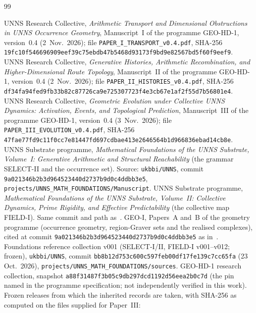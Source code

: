 \clearpage
{}
\begin{thebibliography}{99}\small\raggedright
{} UNNS Research Collective, \emph{Arithmetic Transport and Dimensional Obstructions in UNNS Occurrence Geometry}, Manuscript~I of the programme GEO-HD-1, version~0.4 (2~Nov.\ 2026); file \texttt{PAPER\_I\_TRANSPORT\_v0.4.pdf}, SHA-256 \texttt{19fc10f546696909eef39c75ebdb47b5468d93173f9bd9e82567bd5f60f9eef9}.
 UNNS Research Collective, \emph{Generative Histories, Arithmetic Recombination, and Higher-Dimensional Route Topology}, Manuscript~II of the programme GEO-HD-1, version~0.4 (2~Nov.\ 2026); file \texttt{PAPER\_II\_HISTORIES\_v0.4.pdf}, SHA-256 \texttt{df34fa94fed9fb33b82c87726ca9e725307723f4e3cb67e1af2f55d7b56801e4}.
 UNNS Research Collective, \emph{Geometric Evolution under Collective UNNS Dynamics: Activation, Events, and Topological Prediction}, Manuscript~III of the programme GEO-HD-1, version~0.4 (3~Nov.\ 2026); file \texttt{PAPER\_III\_EVOLUTION\_v0.4.pdf}, SHA-256 \texttt{47fae77fd9c11f0cc7e81447fd697cdbae413e2646564b1d966836ebad14cb8e}.
 UNNS Substrate programme, \emph{Mathematical Foundations of the UNNS Substrate, Volume~I: Generative Arithmetic and Structural Reachability} (the grammar SELECT-II and the occurrence set). Source: \texttt{ukbbi/UNNS}, commit \texttt{9a021346b2b3d964523440d2737b9d0c4ddbb3e5}, \texttt{projects/UNNS\_MATH\_FOUNDATIONS/Manuscript}.
 UNNS Substrate programme, \emph{Mathematical Foundations of the UNNS Substrate, Volume~II: Collective Dynamics, Prime Rigidity, and Effective Predictability} (the collective map FIELD-I). Same commit and path as~\cite{FoundI}.
 GEO-I, Papers~A and~B of the geometry programme (occurrence geometry, region-Graver sets and the realised complexes), cited at commit \texttt{9a021346b2b3d964523440d2737b9d0c4ddbb3e5} as in~\cite{FoundI}.
 Foundations reference collection v001 (SELECT-I/II, FIELD-I v001--v012; frozen), \texttt{ukbbi/UNNS}, commit \texttt{bb8b12d753c600c597feb00df17fe139c7cc65fa} (23 Oct.\ 2026), \texttt{projects/UNNS\_MATH\_FOUNDATIONS/sources}.
 GEO-HD-1 research collection, snapshot \texttt{a88f31487f3b05c9db297dcd1192d56eea2b0c7d} (the pin named in the programme specification; not independently verified in this work). Frozen releases from which the inherited records are taken, with SHA-256 as computed on the files supplied for Paper~III:
\begin{itemize}[leftmargin=1.4em,itemsep=1pt,topsep=2pt]\footnotesize

\end{itemize}
\end{thebibliography}
